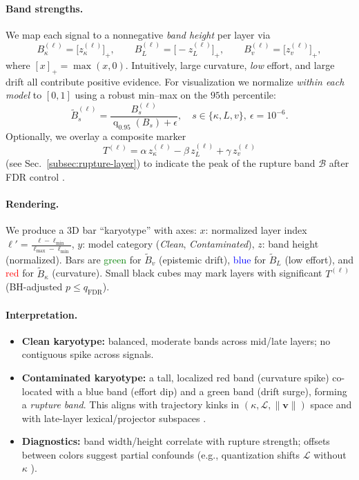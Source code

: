 \documentclass[11pt]{article}
\begin{document}
\paragraph{Band strengths.}
We map each signal to a nonnegative \emph{band height} per layer via
\[
B_\kappa^{(\ell)}=\big[z_\kappa^{(\ell)}\big]_+,\qquad
B_L^{(\ell)}=\big[-z_L^{(\ell)}\big]_+,\qquad
B_v^{(\ell)}=\big[z_v^{(\ell)}\big]_+,
\]
where $[x]_+=\max(x,0)$. Intuitively, large curvature, \emph{low} effort, and large drift all contribute positive evidence.
For visualization we normalize \emph{within each model} to $[0,1]$ using a robust min--max on the $95$th percentile:
\[
\widetilde{B}_s^{(\ell)}=\frac{B_s^{(\ell)}}{\operatorname{q}_{0.95}(B_s)+\epsilon},\quad s\in\{\kappa,L,v\},\ \epsilon=10^{-6}.
\]
Optionally, we overlay a composite marker
\[
T^{(\ell)}=\alpha\,z_\kappa^{(\ell)}-\beta\,z_L^{(\ell)}+\gamma\,z_v^{(\ell)}
\]
(see Sec.~\ref{subsec:rupture-layer}) to indicate the peak of the rupture band $\mathcal{B}$ after FDR control \citep{benjamini1995fdr}.

\paragraph{Rendering.}
We produce a 3D bar ``karyotype'' with axes:
$x$: normalized layer index $\ell'=\frac{\ell-\ell_{\min}}{\ell_{\max}-\ell_{\min}}$,
$y$: model category (\textit{Clean}, \textit{Contaminated}),
$z$: band height (normalized).
Bars are \textcolor{green}{green} for $\widetilde{B}_v$ (epistemic drift), \textcolor{blue}{blue} for $\widetilde{B}_L$ (low effort), and \textcolor{red}{red} for $\widetilde{B}_\kappa$ (curvature).
Small black cubes may mark layers with significant $T^{(\ell)}$ (BH-adjusted $p\!\le\!q_{\mathrm{FDR}}$).%


\paragraph{Interpretation.}
\begin{itemize}
\item \textbf{Clean karyotype:} balanced, moderate bands across mid/late layers; no contiguous spike across signals.
\item \textbf{Contaminated karyotype:} a tall, localized red band (curvature spike) co-located with a blue band (effort dip) and a green band (drift surge), forming a \emph{rupture band}. This aligns with trajectory kinks in $(\kappa,\mathcal{L},\|\mathbf{v}\|)$ space and with late-layer lexical/projector subspaces \citep{ansuini2019intrinsic}.
\item \textbf{Diagnostics:} band width/height correlate with rupture strength; offsets between colors suggest partial confounds (e.g., quantization shifts $\mathcal{L}$ without $\kappa$ \citep{dettmers2022llmint8,frantar2022gptq}).
\end{itemize}
\end{document}
